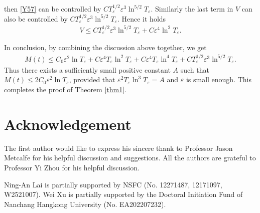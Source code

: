 \documentclass[11pt, reqno]{amsart}
\theoremstyle{definition}
\theoremstyle{remark}
\theoremstyle{definition}
\numberwithin{equation}{section}
\numberwithin{equation}{section}
\def\leq{\leqslant}
\begin{document}
then \eqref{Y57} can be controlled by
$CT_{\varepsilon}^{1/2}\varepsilon^3\ln^{5/2}T_{\varepsilon}$.
Similarly the last term in $V$ can also be controlled by
$CT_{\varepsilon}^{1/2}\varepsilon^3\ln^{5/2}T_{\varepsilon}$.
Hence it holds 
\begin{align*}
V\leq
CT_{\varepsilon}^{1/2}\varepsilon^3\ln^{5/2}T_{\varepsilon}+C\varepsilon^4\ln^2
T_{\varepsilon}.
\end{align*}
\par In conclusion, by combining the discussion above together, we get
\begin{align}\label{Y51}
M(t)\leq C_0\varepsilon^2\ln T_{\varepsilon}+C\varepsilon^4T_{\varepsilon}\ln^2T_{\varepsilon}
+C\varepsilon^4T_{\varepsilon}\ln^4T_{\varepsilon}+CT_{\varepsilon}^{1/2}\varepsilon^3\ln^{5/2}T_{\varepsilon}.
\end{align}
Thus there exists a sufficiently small positive constant $A$ such
that $M(t)\leq 2C_0\varepsilon^2\ln T_{\varepsilon}$, provided that
$\varepsilon^2T_{\varepsilon}\ln^3T_{\varepsilon}=A$ and
$\varepsilon$ is small enough. This completes the proof of Theorem \ref{thm1}.
\section*{Acknowledgement}

The first author would like to express his sincere thank to Professor Jason Metcalfe for his helpful discussion and suggestions. All the authors are grateful to Professor Yi Zhou for his helpful discussion.

Ning-An Lai is partially supported by NSFC (No. 12271487, 12171097, W2521007).
Wei Xu is partially supported by the Doctoral Initiation Fund of Nanchang Hangkong University (No. EA202207232).
\end{document}
